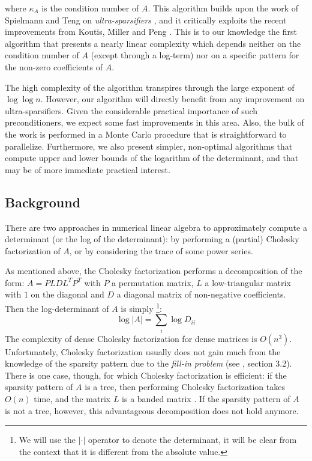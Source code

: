 where $\kappa_{A}$ is the condition number of $A$. This algorithm
builds upon the work of Spielmann and Teng on \emph{ultra-sparsifiers}
\cite{Spielman2009a}, and it critically exploits the recent improvements
from Koutis, Miller and Peng \cite{Koutis2010}. This is to our knowledge
the first algorithm that presents a nearly linear complexity which
depends neither on the condition number of $A$ (except through a
log-term) nor on a specific pattern for the non-zero coefficients
of $A$.

The high complexity of the algorithm transpires through the large
exponent of $\log\log n$. However, our algorithm will directly benefit
from any improvement on ultra-sparsifiers. Given the considerable
practical importance of such preconditioners, we expect some fast
improvements in this area. Also, the bulk of the work is performed
in a Monte Carlo procedure that is straightforward to parallelize.
Furthermore, we also present simpler, non-optimal algorithms that
compute upper and lower bounds of the logarithm of the determinant,
and that may be of more immediate practical interest.


\subsection{Background}

There are two approaches in numerical linear algebra to approximately
compute a determinant (or the log of the determinant): by performing
a (partial) Cholesky factorization of $A$, or by considering the
trace of some power series.

As mentioned above, the Cholesky factorization performs a decomposition
of the form: $A=PLDL^{T}P^{T}$ with $P$ a permutation matrix, $L$
a low-triangular matrix with $1$ on the diagonal and $D$ a diagonal
matrix of non-negative coefficients. Then the log-determinant of $A$
is simply%
\footnote{We will use the $\left|\cdot\right|$ operator to denote the determinant,
it will be clear from the context that it is different from the absolute
value.%
}: 
\[
\log\left|A\right|=\sum_{i}\log D_{ii}
\]
The complexity of dense Cholesky factorization for dense matrices
is $O\left(n^{3}\right)$. Unfortunately, Cholesky factorization usually
does not gain much from the knowledge of the sparsity pattern due
to the \emph{fill-in problem} (see \cite{meurant1999computer}, section
3.2). There is one case, though, for which Cholesky factorization
is efficient: if the sparsity pattern of $A$ is a tree, then performing
Cholesky factorization takes $O\left(n\right)$ time, and the matrix
$L$ is a banded matrix \cite{liu1990eliminationtrees}. If the sparsity
pattern of $A$ is not a tree, however, this advantageous decomposition
does not hold anymore.

